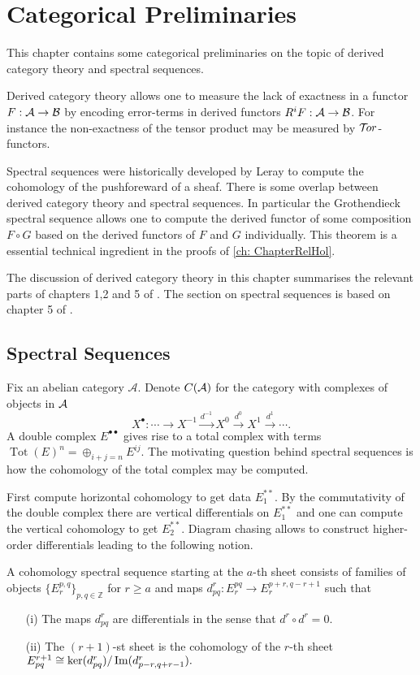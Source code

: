 \chapter{Categorical Preliminaries}\label{ch: ChapterCategory}
This chapter contains some categorical preliminaries on the topic of derived category theory and spectral sequences.

Derived category theory allows one to measure the lack of exactness in a functor $F:\AA \to \mathcal{B}$ by encoding error-terms in derived functors $R^iF:\AA \to \mathcal{B}$.
For instance the non-exactness of the tensor product may be measured by $\Tor$-functors.

Spectral sequences were historically developed by Leray to compute the cohomology of the pushforeward of a sheaf.
There is some overlap between derived category theory and spectral sequences.
In particular the Grothendieck spectral sequence allows one to compute the derived functor of some composition $F\circ G$ based on the derived functors of $F$ and $G$ individually.
This theorem is a essential technical ingredient in the proofs of \cref{ch: ChapterRelHol}.

The discussion of derived category theory in this chapter summarises the relevant parts of chapters 1,2 and 5 of \cite{dimca2004sheaves}.
The section on spectral sequences is based on chapter 5 of \cite{weibel1995introduction}.
\section{Spectral Sequences}
Fix an abelian category $\mathcal{A}$.
Denote $C(\AA)$ for the category with complexes of objects in $\AA$
$$X^\bullet :\cdots \xrightarrow{}  X^{-1}\xrightarrow{d^{-1}} X^0 \xrightarrow{d^{0}} X^1\xrightarrow{d^1} \cdots.$$
A double complex $E^{\bullet \bullet}$ gives rise to a total complex with terms  $\operatorname{Tot}(E)^n = \oplus_{i+j=n} E^{ij}$.
The motivating question behind spectral sequences is how the cohomology of the total complex may be computed.

First compute horizontal cohomology to get data $E^{**}_1$.
By the commutativity of the double complex there are vertical differentials on $E^{**}_1$ and one can compute the vertical cohomology to get $E^{**}_2$.
Diagram chasing allows to construct higher-order differentials leading to the following notion.
\begin{definition}
  A cohomology spectral sequence starting at the $a$-th sheet consists of families of objects $ \{E^{p,q}_r\}_{p,q\in \mathbb{Z}}$ for $r\geq a$ and maps
  $d_{pq}^r : E^{pq}_r \to E^{p+r,q-r+1}_r $
  such that
  \begin{enumerate}
    \item[(i)]  The maps $d^r_{pq}$ are differentials in the sense that
    $d^r \circ d^r = 0.$
    \item[(ii)] The $(r+1)$-st sheet is the cohomology of the $r$-th sheet
    $E_{pq}^{r+1} \cong \ker(d_{pq}^r)/ \img(d_{p-r,q+r-1}^r).$
  \end{enumerate}
\end{definition}

